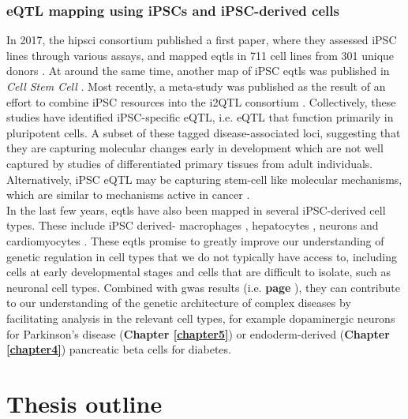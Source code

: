 \subsubsection{eQTL mapping using iPSCs and iPSC-derived cells}

In 2017, the \gls{hipsci} consortium published a first paper, where they assessed iPSC lines through various assays, and mapped \glspl{eqtl} in 711 cell lines from 301 unique donors \cite{kilpinen2017common}.
At around the same time, another map of iPSC \glspl{eqtl} was published in \textit{Cell Stem Cell} \cite{deboever2017large}.
Most recently, a meta-study was published as the result of an effort to combine iPSC resources into the i2QTL consortium \cite{bonder2019systematic}.
Collectively, these studies have identified iPSC-specific eQTL, i.e. eQTL that function primarily in pluripotent cells.
A subset of these tagged disease-associated loci, suggesting that they are capturing molecular changes early in development which are not well captured by studies of differentiated primary tissues from adult individuals. 
Alternatively, iPSC eQTL may be capturing stem-cell like molecular mechanisms, which are similar to mechanisms active in cancer \cite{kilpinen2017common}. \\

In the last few years, \glspl{eqtl} have also been mapped in several iPSC-derived cell types.
These include iPSC derived- macrophages \cite{alasoo2018shared}, hepatocytes \cite{pashos2017large}, neurons \cite{schwartzentruber2018molecular} and cardiomyocytes \cite{strober2019dynamic, banovich2018impact}.
These \glspl{eqtl} promise to greatly improve our understanding of genetic regulation in cell types that we do not typically have access to, including cells at early developmental stages and cells that are difficult to isolate, such as neuronal cell types.
Combined with \gls{gwas} results (i.e. \textbf{page \pageref{sec:eqtl_gwas}}), they can contribute to our understanding of the genetic architecture of complex diseases by facilitating analysis in the relevant cell types, for example dopaminergic neurons for Parkinson's disease (\textbf{Chapter \ref{chapter5}}) or endoderm-derived (\textbf{Chapter 
\ref{chapter4}}) pancreatic beta cells for diabetes.

\newpage

\section{Thesis outline}

